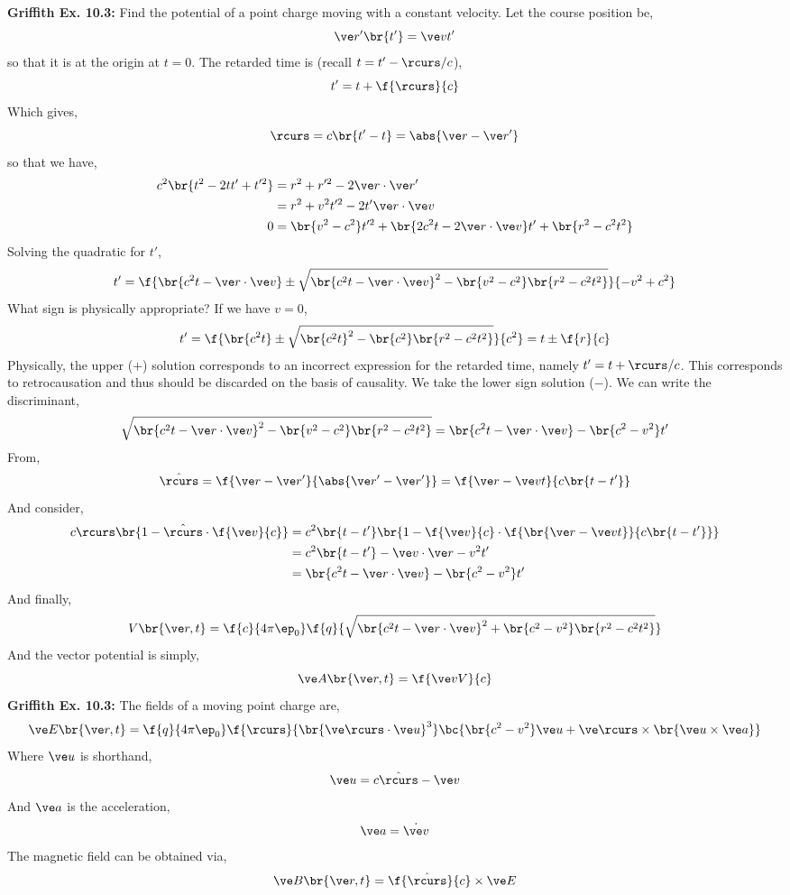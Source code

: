 \documentclass{article}
\begin{document}
\textbf{Griffith Ex. 10.3:} Find the potential of a point charge moving with a constant velocity. Let the course position be,
\[ \ve r' \br{t'} = \ve v t' \]
so that it is at the origin at $t = 0$. The retarded time is (recall $t = t' - \rcurs / c$),
\[ t' = t + \f{\rcurs}{c} \]
Which gives,
\[ \rcurs =c\br{t' - t} = \abs{\ve r - \ve r'} \]
so that we have,
\begin{align*}
c^2 \br{t^2 - 2tt' + t'^2}
&= r^2 +r'^2 - 2 \ve r\cdot \ve r' \\
&= r^2 + v^2 t'^2- 2 t' \ve r \cdot \ve v \\
0 &= \br{v^2 - c^2} t'^2 + \br{2 c^2 t - 2 \ve r \cdot \ve v} t' + \br{r^2 - c^2 t^2}
\end{align*}
Solving the quadratic for $t'$,
\[ t' = \f{\br{c^2 t - \ve r \cdot \ve v} \pm \sqrt{\br{c^2 t - \ve r \cdot \ve v}^2 - \br{v^2 - c^2}\br{r^2 - c^2 t^2}}}{-v^2 + c^2}\]
What sign is physically appropriate? If we have $v = 0$,
\[ t' = \f{\br{c^2 t} \pm \sqrt{\br{c^2 t}^2 - \br{c^2}\br{r^2 - c^2 t^2}}}{c^2} = t\pm \f{r}{c}\]
Physically, the upper ($+$) solution corresponds to an incorrect expression for the retarded time, namely $t' = t + \rcurs / c$. This corresponds to retrocausation and thus should be discarded on the basis of causality. We take the lower sign solution ($-$). We can write the discriminant,
\[ \sqrt{\br{c^2 t - \ve r \cdot \ve v}^2 - \br{v^2 - c^2}\br{r^2 - c^2 t^2}} = \br{c^2 t - \ve r \cdot \ve v} - \br{c^2 - v^2} t' \]
From,
\[ \hat \rcurs = \f{\ve r - \ve r'}{\abs{\ve r' - \ve r'}}= \f{\ve r - \ve v t}{c\br{t - t'}} \]
And consider,
\begin{align*}
c\rcurs \br{1 - \hat \rcurs \cdot \f{\ve v}{c}}
&= c^2 \br{t - t'} \br{1 - \f{\ve v}{c} \cdot \f{\br{\ve r - \ve v t}}{c \br{t - t'}}} \\
&= c^2 \br{t - t'} -  \ve v \cdot \ve r - v^2 t' \\
&= \br{c^2 t - \ve r \cdot \ve v} - \br{c^2 - v^2 }t'
\end{align*}
And finally,
\[ V\br{\ve r, t}= \f{c}{4 \pi \ep_0} \f{q}{\sqrt{\br{c^2 t - \ve r \cdot \ve v}^2 + \br{c^2 - v^2}\br{r^2 - c^2 t^2}}} \]
And the vector potential is simply,
\[ \ve A \br{\ve r, t} = \f{\ve v V}{c} \]
\textbf{Griffith Ex. 10.3:} The fields of a moving point charge are,
\[ \ve E \br{\ve r, t} = \f{q}{4 \pi \ep_0} \f{\rcurs}{\br{\ve \rcurs \cdot \ve u}^3} \bc{\br{c^2 - v^2} \ve u + \ve \rcurs \times \br{\ve u \times \ve a}} \]
Where $\ve u$ is shorthand,
\[ \ve u = c \hat \rcurs - \ve v \]
And $\ve a$ is the acceleration,
\[ \ve a = \dot{\ve v} \]
The magnetic field can be obtained via,
\[ \ve B\br{\ve r, t} = \f{\hat \rcurs}{c} \times \ve E \]
\end{document}
